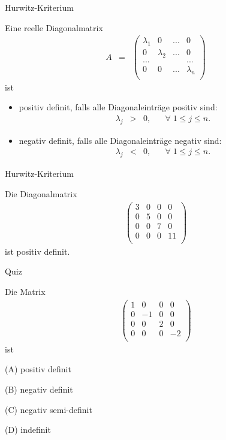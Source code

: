 \documentclass[german]{beamer}
\newcommand{\bq}{\begin{eqnarray*}}
\newcommand{\eq}{\end{eqnarray*}}
\begin{document}
\begin{frame}{Hurwitz-Kriterium}

\begin{theorem}
Eine reelle Diagonalmatrix
\bq
 A & = & \left( \begin{array}{cccc}
 \lambda_1 & 0 & ... & 0 \\
 0 & \lambda_2 & ... & 0 \\
 ... & & & ... \\
 0 & 0 & ... & \lambda_n \\
 \end{array} \right)
\eq
ist 
\begin{itemize}
\item positiv definit, falls alle Diagonaleintr\"age positiv sind:
\bq
 \lambda_j & > & 0,
 \;\;\;\;\;\; \forall \; 1 \le j \le n.
\eq
\item negativ definit, falls alle Diagonaleintr\"age negativ sind:
\bq
 \lambda_j & < & 0,
 \;\;\;\;\;\; \forall \; 1 \le j \le n.
\eq
\end{itemize}
\end{theorem}

\end{frame}

\begin{frame}{Hurwitz-Kriterium}

\begin{example}
Die Diagonalmatrix
\bq
 \left( \begin{array}{cccc}
 3 & 0 & 0 & 0 \\
 0 & 5 & 0 & 0 \\
 0 & 0 & 7 & 0 \\
 0 & 0 & 0 & 11 \\
 \end{array} \right)
\eq
ist positiv definit.
\end{example}

\end{frame}

\begin{frame}{Quiz}

Die Matrix
\bq
 \left( \begin{array}{rrrr}
 1 & 0 & 0 & 0 \\
 0 & -1 & 0 & 0 \\
 0 & 0 & 2 & 0 \\
 0 & 0 & 0 & -2 \\
 \end{array} \right)
\eq
ist 
\begin{description}
\item{(A)} positiv definit
\item{(B)} negativ definit
\item{(C)} negativ semi-definit
\item{(D)} indefinit
\end{description}

\end{frame}
\end{document}
